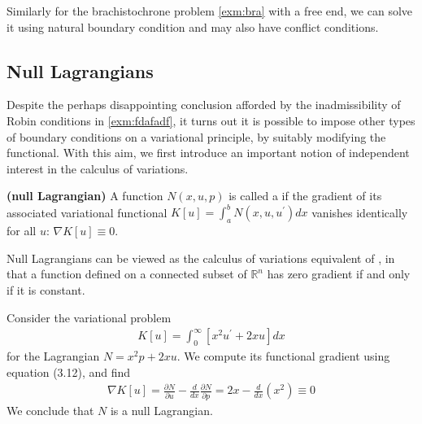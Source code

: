 \documentclass{article}
\newcommand{\bfs}[1]{\textbf{({#1}) }}
\begin{document}
Similarly for  the brachistochrone problem \cref{exm:bra} with a free end, we can solve it using natural boundary condition and may also have conflict conditions.

\subsection{Null Lagrangians}
Despite the perhaps disappointing conclusion afforded by the inadmissibility of Robin conditions in \cref{exm:fdafadf}, it turns out it is possible to impose other types of boundary conditions on a variational principle, by suitably modifying the functional. With this aim, we first introduce an important notion of independent interest in the calculus of variations.
\begin{defa}\bfs{null Lagrangian}
A function $N(x, u, p)$ is called a  if the gradient of its associated variational functional $K[u]=\int_{a}^{b} N\left(x, u, u^{\prime}\right) d x$ vanishes identically for all $u$: $\nabla K[u] \equiv 0$.
\end{defa} 
\begin{rema}
Null Lagrangians can be viewed as the calculus of variations equivalent of , in that a function defined on a connected subset of $\mathbb{R}^{n}$ has zero gradient if and only if it is constant.
\end{rema}
\begin{exma}
Consider the variational problem
\begin{align*}
K[u]=\int_{0}^{\infty}\left[x^{2} u^{\prime}+2 x u\right] d x
\end{align*}
for the Lagrangian $N=x^{2} p+2 x u$. We compute its functional gradient using equation (3.12), and find
\begin{align*}
\nabla K[u]=\frac{\partial N}{\partial u}-\frac{d}{d x} \frac{\partial N}{\partial p}=2 x-\frac{d}{d x}\left(x^{2}\right) \equiv 0
\end{align*}
We conclude that $N$ is a null Lagrangian.
\end{exma}
\end{document}
